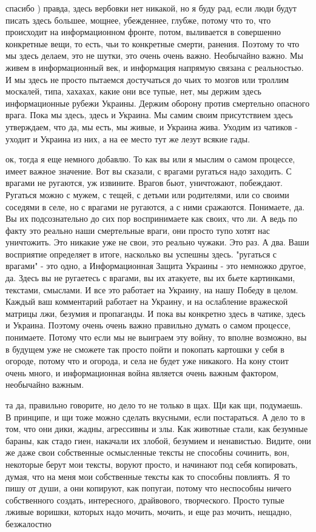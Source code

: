 спасибо ) правда, здесь вербовки нет никакой, но я буду рад, если люди будут
писать здесь большее, мощнее, убежденнее, глубже, потому что то, что происходит
на информационном фронте, потом, выливается в совершенно конкретные вещи, то
есть, чьи то конкретные смерти, ранения. Поэтому то что мы здесь делаем, это не
шутки, это очень очень важно. Необычайно важно. Мы живем в информационный век,
и информация напрямую связана с реальностью. И мы здесь не просто пытаемся
достучаться до чьих то мозгов или троллим москалей, типа, хахахах, какие они
все тупые, нет, мы держим здесь информационные рубежи Украины. Держим оборону
против смертельно опасного врага. Пока мы здесь, здесь и Украина. Мы самим
своим присутствием здесь утверждаем, что да, мы есть, мы живые, и Украина жива.
Уходим из чатиков - уходит и Украина из них, а на ее место тут же лезут всякие
гады.


ок, тогда я еще немного добавлю. То как вы или я мыслим о самом процессе, имеет
важное значение. Вот вы сказали, с врагами ругаться надо заходить. С врагами не
ругаются, уж извините. Врагов бьют, уничтожают, побеждают. Ругаться можно с
мужем, с тещей, с детьми или родителями, или со своими соседями в селе, но с
врагами не ругаются, а с ними сражаются. Понимаете, да. Вы их подсознательно до
сих пор воспринимаете как своих, что ли. А ведь по факту это реально наши
смертельные враги, они просто тупо хотят нас уничтожить. Это никакие уже не
свои, это реально чужаки. Это раз. А два. Ваши восприятие определяет в итоге,
насколько вы успешны здесь. "ругаться с врагами" - это одно, а Информационная
Защита Украины - это немножко другое, да. Здесь вы не ругаетесь с врагами, вы
их атакуете, вы их бьете картинками, текстами, смыслами. И все это работает на
Украину, на нашу Победу в целом. Каждый ваш комментарий работает на Украину, и
на ослабление вражеской матрицы лжи, безумия и пропаганды. И пока вы конкретно
здесь в чатике, здесь и Украина. Поэтому очень очень важно правильно думать о
самом процессе, понимаете. Потому что если мы не выиграем эту войну, то вполне
возможно, вы в будущем уже не сможете так просто пойти и покопать картошки у
себя в огороде, потому что и огорода, и села не будет уже никакого. На кону
стоит очень много, и информационная война является очень важным фактором,
необычайно важным.

та да, правильно говорите, но дело то не только в щах. Щи как щи, подумаешь. В
принципе, и щи тоже можно сделать вкусными, если постараться. А дело то в том,
что они дики, жадны, агрессивны и злы. Как животные стали, как безумные бараны,
как стадо гиен, накачали их злобой, безумием и ненавистью. Видите, они же даже
свои собственные осмысленные тексты не способны сочинить, вон, некоторые берут
мои тексты, воруют просто, и начинают под себя копировать, думая, что на меня
мои собственные тексты как то способны повлиять. Я то пишу от души, а они
копируют, как попугаи, потому что неспособны ничего собственного создать,
интересного, драйвового, творческого. Просто тупые лживые воришки, которых надо
мочить, мочить, и еще раз мочить, нещадно, безжалостно

